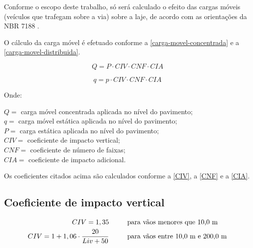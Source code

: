 Conforme o escopo deste trabalho, só será calculado o efeito das cargas móveis (veículos que trafegam sobre a via) sobre a laje, de acordo com as orientações da NBR 7188 \cite{NBR7188:2013}.

O cálculo da carga móvel é efetuado conforme a \autoref{carga-movel-concentrada} e a \autoref{carga-movel-distribuida}.

\begin{equation} \label{carga-movel-concentrada}
Q = P \cdot CIV \cdot CNF \cdot CIA
\end{equation}

\begin{equation} \label{carga-movel-distribuida}
q = p \cdot CIV \cdot CNF \cdot CIA
\end{equation}

Onde:

$ Q = $ carga móvel concentrada aplicada no nível do pavimento; \\ \indent
$ q = $ carga móvel estática aplicada no nível do pavimento; \\ \indent
$ P = $ carga estática aplicada no nível do pavimento; \\ \indent
$ CIV = $ coeficiente de impacto vertical; \\ \indent
$ CNF = $ coeficiente de número de faixas; \\ \indent
$ CIA = $ coeficiente de impacto adicional. \\ \indent


Os coeficientes citados acima são calculados conforme a \autoref{CIV}, a \autoref{CNF} e a \autoref{CIA}.

\subsection{Coeficiente de impacto vertical}

\begin{equation} \label{CIV}
  \begin{split}
    CIV = 1,35     & \textrm{ \hspace{2em} para vãos menores que 10,0 m} \\
    CIV = 1 + 1,06 \cdot \frac{20}{Liv + 50} & \textrm{ \hspace{2em} para vãos entre 10,0 m e 200,0 m}
  \end{split}
\end{equation}

